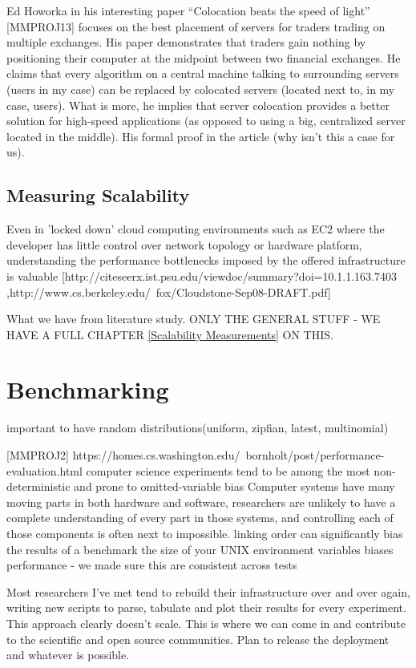 \documentclass{uvamscse}
\begin{document}
Ed Howorka in his interesting paper “Colocation beats the speed of light” [MMPROJ13] focuses on the best placement of servers for traders trading on multiple exchanges. His paper demonstrates that traders gain nothing by positioning their computer at the midpoint between two financial exchanges. He claims that  every algorithm on a central machine talking to surrounding servers (users in my case) can be replaced by colocated servers (located next to, in my case, users). What is more, he implies that server colocation provides a better solution for high-speed applications (as opposed to using a big, centralized server located in the middle). His formal proof in the article (why isn't this a case for us).

\subsection{Measuring Scalability} \label{Measuring Scalability}
Even in 'locked down' cloud computing environments such as EC2 where the developer has little control over network topology or hardware platform, understanding the performance bottlenecks imposed by the offered infrastructure is valuable [http://citeseerx.ist.psu.edu/viewdoc/summary?doi=10.1.1.163.7403 ,http://www.cs.berkeley.edu/~fox/Cloudstone-Sep08-DRAFT.pdf]

What we have from literature study. ONLY THE GENERAL STUFF - WE HAVE A FULL CHAPTER \ref{Scalability Measurements} ON THIS.

\section{Benchmarking}

\cite{Ycsb} important to have random distributions(uniform, zipfian, latest, multinomial)

[MMPROJ2] https://homes.cs.washington.edu/~bornholt/post/performance-evaluation.html
computer science experiments tend to be among the most non-deterministic and prone to omitted-variable bias
Computer systems have many moving parts in both hardware and software, researchers are unlikely to have a complete understanding of every part in those systems, and controlling each of those components is often next to impossible.
linking order can significantly bias the results of a benchmark
the size of your UNIX environment variables biases performance - we made sure this are consistent across tests

Most researchers I’ve met tend to rebuild their infrastructure over and over again, writing new scripts to parse, tabulate and plot their results for every experiment. This approach clearly doesn’t scale.
This is where we can come in and contribute to the scientific and open source communities. Plan to release the deployment and whatever is possible.
\end{document}
